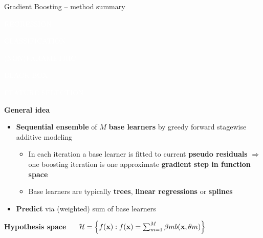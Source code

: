\documentclass[11pt,compress,t,notes=noshow, xcolor=table]{beamer}
\newcommand{\highlight}[1]{\textcolor{hlcol}{\textbf{#1}}}
\newcommand{\maketag}[2][100]{
  \colorbox{hlcol!#1}{\textcolor{white}{\MakeUppercase{\scriptsize #2}} 
  \vphantom{}}
}
\begin{document}
\begin{vbframe}{Gradient Boosting -- method summary}
\maketag{regression} \maketag{classification}
\maketag[50]{(NON)PARAMETRIC}
\maketag{BLACK-BOX}
\maketag{FEATURE SELECTION}

\medskip

\highlight{General idea}

\begin{itemize}
  \item \textbf{Sequential ensemble} of $M$ \textbf{base learners} by greedy forward stagewise additive modeling
  \begin{itemize}
      \item In each iteration a base learner is fitted to current \textbf{pseudo residuals} $\Rightarrow$ one boosting iteration is one approximate \textbf{gradient step in function space}
      \item Base learners are typically \textbf{trees}, \textbf{linear regressions} or \textbf{splines}
  \end{itemize}
  \item \textbf{Predict} via (weighted) sum of base learners
  
\end{itemize}

\medskip

\highlight{Hypothesis space} ~~
$\mathcal{H} = \left\{ f(\mathbf{x}): f(\mathbf{x}) = \sum_{m = 1}^M \beta m b(\mathbf{x}, \theta m) \right\}$


\end{vbframe}
\end{document}
